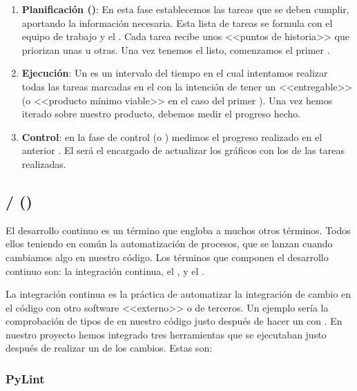 \begin{enumerate}
  \item \textbf{Planificación ()}: En esta fase establecemos las tareas que se deben cumplir, aportando la información necesaria. Esta lista de tareas se formula con el equipo de trabajo y el . Cada tarea recibe unos <<puntos de historia>> que priorizan unas u otras. Una vez tenemos el  listo, comenzamos el primer .

  \item \textbf{Ejecución}: Un  es un intervalo del tiempo en el cual intentamos realizar todas las tareas marcadas en el  con la intención de tener un <<entregable>> (o <<producto mínimo viable>> en el caso del primer ). Una vez hemos iterado sobre nuestro producto, debemos medir el progreso hecho.

  \item \textbf{Control}: en la fase de control (o ) medimos el progreso realizado en el anterior . El  será el encargado de actualizar los gráficos con los  de las tareas realizadas.
\end{enumerate}

\subsection{ /  ()}

El desarrollo continuo es un término que engloba a muchos otros términos. Todos ellos teniendo en común la automatización de procesos, que se lanzan cuando cambiamos algo en nuestro código. Los términos que componen el desarrollo continuo son: la integración continua, el ,  y el .

La integración continua es la práctica de automatizar la integración de cambio en el código con otro software <<externo>> o de terceros. Un ejemplo sería la comprobación de tipos de en nuestro código justo después de hacer un  con . En nuestro proyecto hemos integrado tres herramientas que se ejecutaban justo después de realizar un  de los cambios. Estas son:

\subsubsection{PyLint}

